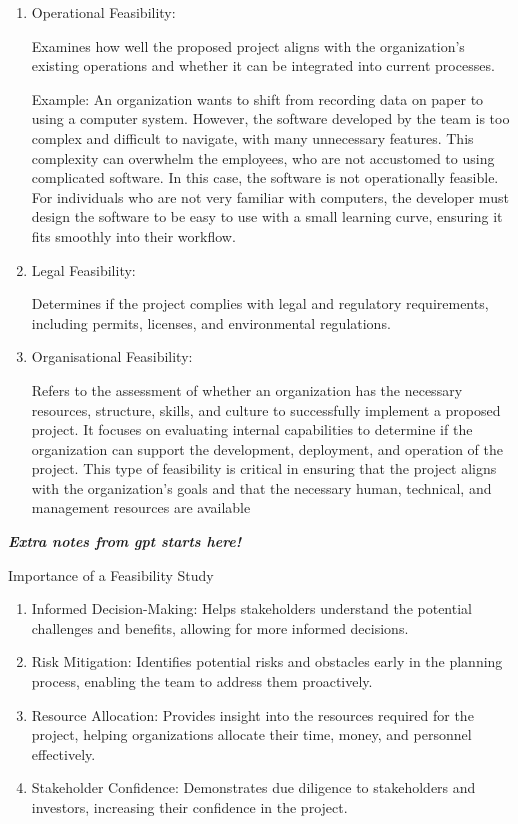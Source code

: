\documentclass[a4paper]{article}
\begin{document}
\begin{enumerate}
    \item Operational Feasibility:

            Examines how well the proposed project aligns with the organization’s existing operations and whether it can be integrated into 
            current processes.
            
            Example: An organization wants to shift from recording data on paper to using a computer system.
            However, the software developed by the team is too complex and difficult to navigate, with many unnecessary features.
            This complexity can overwhelm the employees, who are not accustomed to using complicated software.
            In this case, the software is not operationally feasible. For individuals who are not very familiar with computers, 
            the developer must design the software to be easy to use with a small learning curve, ensuring it fits smoothly into their workflow.


    \item Legal Feasibility:
           
            Determines if the project complies with legal and regulatory requirements, including permits, licenses, and environmental regulations.
            
    \item Organisational Feasibility: 
        
        Refers to the assessment of whether an organization has the necessary resources, structure, skills, and culture to successfully implement 
        a proposed project. It focuses on evaluating internal capabilities to determine if the organization can support 
        the development, deployment, and operation of the project. This type of feasibility is critical in ensuring that the project aligns with
        the organization's goals and that the necessary human, technical, and management resources are available


\end{enumerate}



\textbf{\textit{Extra notes from gpt starts here! }}

Importance of a Feasibility Study
\begin{enumerate}
    \item Informed Decision-Making: Helps stakeholders understand the potential challenges and benefits, allowing for more informed decisions.
    \item Risk Mitigation: Identifies potential risks and obstacles early in the planning process, enabling the team to address them proactively.
    \item Resource Allocation: Provides insight into the resources required for the project, 
        helping organizations allocate their time, money, and personnel effectively.
    \item Stakeholder Confidence: Demonstrates due diligence to stakeholders and investors, increasing their confidence in the project.
\end{enumerate}
\end{document}
